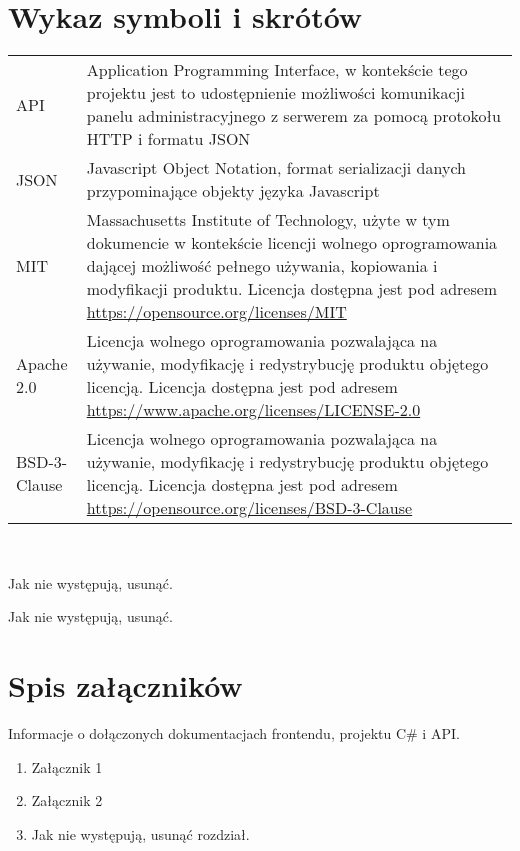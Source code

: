 \documentclass[a4paper,11pt,twoside]{report}
\theoremstyle{definition}
\begin{document}
\thispagestyle{empty}



\chapter*{Wykaz symboli i skrótów}

\begin{tabular}{p{} p{}}
	API 
	& Application Programming Interface, w kontekście tego projektu jest to udostępnienie możliwości komunikacji panelu administracyjnego z serwerem za pomocą protokołu HTTP i formatu JSON \\
	JSON
	& Javascript Object Notation, format serializacji danych przypominające objekty języka Javascript \\
	MIT
	& Massachusetts Institute of Technology, użyte w tym dokumencie w kontekście licencji wolnego oprogramowania dającej możliwość pełnego używania, kopiowania i modyfikacji produktu. Licencja dostępna jest pod adresem \newline
	\url{https://opensource.org/licenses/MIT} \\
	Apache 2.0
	& Licencja wolnego oprogramowania pozwalająca na używanie, modyfikację i redystrybucję produktu objętego licencją. Licencja dostępna jest pod adresem \newline
	\url{https://www.apache.org/licenses/LICENSE-2.0} \\
	BSD-3-Clause
	& Licencja wolnego oprogramowania pozwalająca na używanie, modyfikację i redystrybucję produktu objętego licencją. Licencja dostępna jest pod adresem \newline
	\url{https://opensource.org/licenses/BSD-3-Clause}
\end{tabular}
\\
\thispagestyle{empty}


\listoffigures
\thispagestyle{empty}
Jak nie występują, usunąć.


\renewcommand{\listtablename}{Spis tabel}
\listoftables
\thispagestyle{empty}
Jak nie występują, usunąć.



\chapter*{Spis załączników}

Informacje o dołączonych dokumentacjach frontendu, projektu C\# i API.

\begin{enumerate}
\item Załącznik 1
\item Załącznik 2
\item Jak nie występują, usunąć rozdział.
\end{enumerate}
\thispagestyle{empty}
\end{document}
